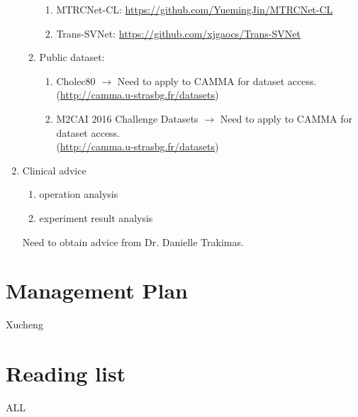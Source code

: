 \documentclass[11pt]{article} \usepackage[top=1in, bottom=1in, left=1in, right=1in]{geometry}
\begin{document}
\begin{enumerate}
\begin{enumerate}
\begin{enumerate}
                        \item MTRCNet-CL: \url{https://github.com/YuemingJin/MTRCNet-CL}
                        \item Trans-SVNet: \url{https://github.com/xjgaocs/Trans-SVNet}
                    \end{enumerate}
              \item Public dataset:
                    \begin{enumerate}
                        \item Cholec80 $\rightarrow$ Need to apply to CAMMA for dataset access. \\(\url{http://camma.u-strasbg.fr/datasets})
                        \item M2CAI 2016 Challenge Datasets $\rightarrow$ Need to apply to CAMMA for dataset access. \\(\url{http://camma.u-strasbg.fr/datasets})
                    \end{enumerate}
          \end{enumerate}
    \item Clinical advice
          \begin{enumerate}
              \item operation analysis
              \item experiment result analysis
          \end{enumerate}
          Need to obtain advice from Dr. Danielle Trakimas.
\end{enumerate}
\section{Management Plan}
Xucheng
\section{Reading list}
ALL
\end{document}
